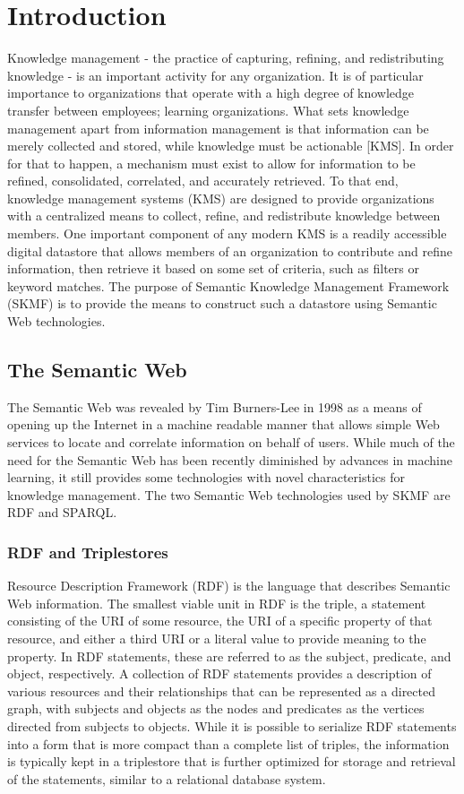 \chapter{Introduction}

Knowledge management - the practice of capturing, refining, and redistributing knowledge - is an important activity for any organization. It is of particular importance to organizations that operate with a high degree of knowledge transfer between employees; learning organizations. What sets knowledge management apart from information management is that information can be merely collected and stored, while knowledge must be actionable [KMS]. In order for that to happen, a mechanism must exist to allow for information to be refined, consolidated, correlated, and accurately retrieved. To that end, knowledge management systems (KMS) are designed to provide organizations with a centralized means to collect, refine, and redistribute knowledge between members. One important component of any modern KMS is a readily accessible digital datastore that allows members of an organization to contribute and refine information, then retrieve it based on some set of criteria, such as filters or keyword matches. The purpose of Semantic Knowledge Management Framework (SKMF) is to provide the means to construct such a datastore using Semantic Web technologies.


\section{The Semantic Web}

The Semantic Web was revealed by Tim Burners-Lee in 1998 as a means of opening up the Internet in a machine readable manner that allows simple Web services to locate and correlate information on behalf of users. While much of the need for the Semantic Web has been recently diminished by advances in machine learning, it still provides some technologies with novel characteristics for knowledge management. The two Semantic Web technologies used by SKMF are RDF and SPARQL.


\subsection{RDF and Triplestores}

Resource Description Framework (RDF) is the language that describes Semantic Web information. The smallest viable unit in RDF is the triple, a statement consisting of the URI of some resource, the URI of a specific property of that resource, and either a third URI or a literal value to provide meaning to the property. In RDF statements, these are referred to as the subject, predicate, and object, respectively. A collection of RDF statements provides a description of various resources and their relationships that can be represented as a directed graph, with subjects and objects as the nodes and predicates as the vertices directed from subjects to objects. While it is possible to serialize RDF statements into a form that is more compact than a complete list of triples, the information is typically kept in a triplestore that is further optimized for storage and retrieval of the statements, similar to a relational database system.

